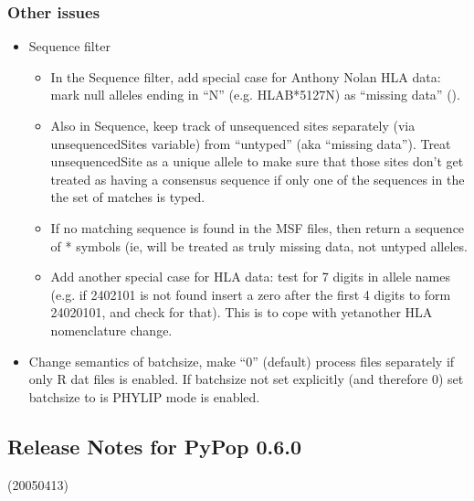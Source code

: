 \documentclass[letterpaper,10pt,english,openany,oneside]{sphinxmanual}
\begin{document}
\subsubsection{Other issues}
\label{\detokenize{docs/guide-chapter-changes:other-issues}}\begin{itemize}
\item {} 
\sphinxAtStartPar
Sequence filter
\begin{itemize}
\item {} 
\sphinxAtStartPar
In the Sequence filter, add special case for Anthony Nolan HLA data:
mark null alleles ending in “N” (e.g. HLA\sphinxhyphen{}B*5127N) as “missing
data” (\sphinxcode{\sphinxupquote{****}}).

\item {} 
\sphinxAtStartPar
Also in Sequence, keep track of unsequenced sites separately
(via unsequencedSites variable) from “untyped” (aka “missing
data”). Treat unsequencedSite as a unique allele to make sure that
those sites don’t get treated as having a consensus sequence if
only one of the sequences in the the set of matches is typed.

\item {} 
\sphinxAtStartPar
If no matching sequence is found in the MSF files, then return a
sequence of * symbols (ie, will be treated as truly missing data,
not untyped alleles.

\item {} 
\sphinxAtStartPar
Add another special case for HLA data: test for 7 digits in allele names
(e.g. if 2402101 is not found insert a zero after the first 4
digits to form 24020101, and check for that).  This is to cope
with yet\sphinxhyphen{}another HLA nomenclature change.

\end{itemize}

\item {} 
\sphinxAtStartPar
Change semantics of batchsize, make “0” (default) process files separately
if only R dat files is enabled.  If batchsize not set explicitly
(and therefore 0) set batchsize to  is PHYLIP mode is enabled.

\end{itemize}


\subsection{Release Notes for PyPop 0.6.0}
\label{\detokenize{docs/guide-chapter-changes:release-notes-for-pypop-0-6-0}}
\sphinxAtStartPar
(2005\sphinxhyphen{}04\sphinxhyphen{}13)
\end{document}
